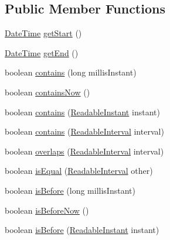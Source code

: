 \subsection*{Public Member Functions}
\begin{DoxyCompactItemize}
\item 
\hyperlink{classorg_1_1joda_1_1time_1_1_date_time}{Date\-Time} \hyperlink{classorg_1_1joda_1_1time_1_1base_1_1_abstract_interval_abec36d26941b54e422a776545705b73e}{get\-Start} ()
\item 
\hyperlink{classorg_1_1joda_1_1time_1_1_date_time}{Date\-Time} \hyperlink{classorg_1_1joda_1_1time_1_1base_1_1_abstract_interval_a3dd19a9ea7ac6f8cb2db1160ca7d6b4d}{get\-End} ()
\item 
boolean \hyperlink{classorg_1_1joda_1_1time_1_1base_1_1_abstract_interval_a46934decb3f5bd6c6f38ef24d31999ca}{contains} (long millis\-Instant)
\item 
boolean \hyperlink{classorg_1_1joda_1_1time_1_1base_1_1_abstract_interval_a2a9f3afb61bb60903b926c6a266d24b6}{contains\-Now} ()
\item 
boolean \hyperlink{classorg_1_1joda_1_1time_1_1base_1_1_abstract_interval_a4fbda92384a0d0a45ba8771f429794b0}{contains} (\hyperlink{interfaceorg_1_1joda_1_1time_1_1_readable_instant}{Readable\-Instant} instant)
\item 
boolean \hyperlink{classorg_1_1joda_1_1time_1_1base_1_1_abstract_interval_a1d3a64806055c4084fa7915d65fb131d}{contains} (\hyperlink{interfaceorg_1_1joda_1_1time_1_1_readable_interval}{Readable\-Interval} interval)
\item 
boolean \hyperlink{classorg_1_1joda_1_1time_1_1base_1_1_abstract_interval_aaefcc0fd3e4ffea3688891e494e0c06e}{overlaps} (\hyperlink{interfaceorg_1_1joda_1_1time_1_1_readable_interval}{Readable\-Interval} interval)
\item 
boolean \hyperlink{classorg_1_1joda_1_1time_1_1base_1_1_abstract_interval_aae1aa421fd370179e5bb5116a93dfc4a}{is\-Equal} (\hyperlink{interfaceorg_1_1joda_1_1time_1_1_readable_interval}{Readable\-Interval} other)
\item 
boolean \hyperlink{classorg_1_1joda_1_1time_1_1base_1_1_abstract_interval_a43fdb253b427917339da615462b9c9e8}{is\-Before} (long millis\-Instant)
\item 
boolean \hyperlink{classorg_1_1joda_1_1time_1_1base_1_1_abstract_interval_ac524cae8193458e7905cce74c709aaf4}{is\-Before\-Now} ()
\item 
boolean \hyperlink{classorg_1_1joda_1_1time_1_1base_1_1_abstract_interval_a7e06c17a33c961a3a6992193b5fcaaf3}{is\-Before} (\hyperlink{interfaceorg_1_1joda_1_1time_1_1_readable_instant}{Readable\-Instant} instant)

\end{DoxyCompactItemize}
